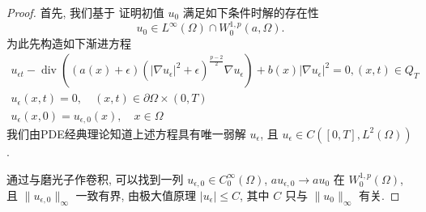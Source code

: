 \documentclass[twoside,longtitle]{LZUthesis}
\theoremstyle{definition}
\numberwithin{equation}{chapter}
\newcommand*\abs[1]{\lvert#1\rvert}
\newcommand*\norm[1]{\lVert#1\rVert}
\DeclareMathOperator{\Div}{div}
\begin{document}
\begin{proof}
	首先, 我们基于 {\cite{Zhan2019Uniquenessa}} 证明初值 $u_0$ 满足如下条件时解的存在性
	\begin{equation}\label{initial_data_condition_tmp}
		u_0 \in L^{\infty}(\Omega) \cap W_0^{1, p}(a, \Omega).
	\end{equation}
	为此先构造如下渐进方程
\begin{gather}
	u_{\epsilon t}-\Div\left((a(x)+\epsilon)
	\left(\left|\nabla u_{\epsilon}\right|^{2}+\epsilon\right)^{\frac{p-2}{2}} \nabla u_{\epsilon}\right)
	+b(x)\left|\nabla u_{\epsilon}\right|^{2} = 0,(x, t) \in Q_{T} \label{eq:approximated_maineq} \\
	u_{\epsilon}(x, t)  = 0, \quad(x, t) \in \partial \Omega \times(0, T)\\
	u_{\epsilon}(x, 0)  = u_{\epsilon, 0}(x), \quad x \in \Omega
\end{gather}
	我们由PDE经典理论知道上述方程具有唯一弱解 $u_\epsilon$, 且 $u_\epsilon \in C([0, T], L^2(\Omega))$.

	通过与磨光子作卷积,
	可以找到一列 $u_{\epsilon,0} \in C_0^\infty(\Omega) $, $au_{\epsilon,0} \to au_0 $ 在 $W_0^{1,p}(\Omega) $,
	且 $\norm{u_{\epsilon, 0}}_{\infty}$ 一致有界, 
	由极大值原理 $\abs{u_{\epsilon}} \leq C$,
	其中 $C$ 只与 $\norm{u_0}_{\infty} $ 有关.


\end{proof}
\end{document}
